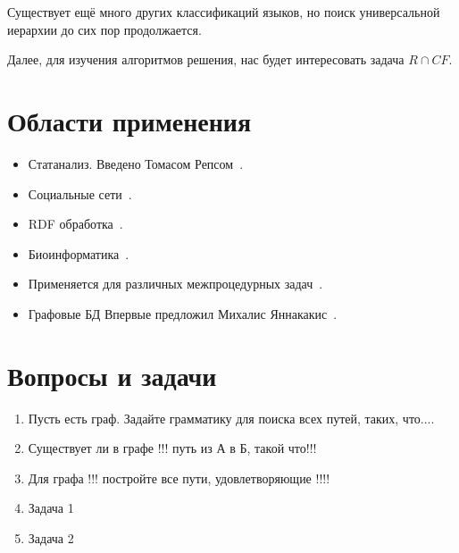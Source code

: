 Существует ещё много других классификаций языков, но поиск универсальной иерархии до сих пор продолжается.

Далее, для изучения алгоритмов решения, нас будет интересовать задача $R \cap CF$.

\section{Области применения}
\begin{itemize}
    \item Статанализ. 
    Введено Томасом Репсом~\cite{Reps}.
    \item Социальные сети~\cite{Hellings2015PathRF}.
    \item RDF обработка~\cite{10.1007/978-3-319-46523-4_38}.
    \item Биоинформатика~\cite{cfpqBio}.
    \item Применяется для различных межпроцедурных задач~\cite{LabelFlowCFLReachability,specificationCFLReachability,Zheng}.
    \item Графовые БД
    Впервые предложил Михалис Яннакакис~\cite{Yannakakis}.
    
\end{itemize}

\section{Вопросы и задачи}
\begin{enumerate}
    \item Пусть есть граф. Задайте грамматику для поиска всех путей, таких, что....
    \item Существует ли в графе !!! путь из А в Б, такой что!!!
    \item Для графа !!! постройте все пути, удовлетворяющие !!!!
    
    \item Задача 1
    \item Задача 2
\end{enumerate}
